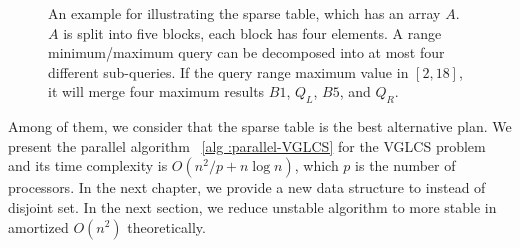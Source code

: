 \begin{figure*}[!thb]
  \centering
  \caption{
An example for illustrating the sparse table, which has an array $A$.
$A$ is split into five blocks, each block has four elements. A range
minimum/maximum query can be decomposed into at most four different
sub-queries.  If the query range maximum value in $[2, 18]$, it will
merge four maximum results $B1$, $Q_L$, $B5$, and $Q_R$.
}

  \label{fig:interval-decomposition}
\end{figure*}

Among of them, we consider that the sparse table is the best
alternative plan.  We present the parallel algorithm ~\ref{alg
:parallel-VGLCS} for the VGLCS problem and its time complexity is
$O(n^2 / p + n \log n)$, which $p$ is the number of processors. In the
next chapter, we provide a new data structure to instead of disjoint
set. In the next section, we reduce unstable algorithm to more stable
in amortized $O(n^2)$ theoretically.


